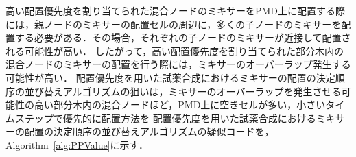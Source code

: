 高い配置優先度を割り当てられた混合ノードのミキサーをPMD上に配置する際には，親ノードのミキサーの配置セルの周辺に，多くの子ノードのミキサーを配置する必要がある．その場合，それぞれの子ノードのミキサーが近接して配置される可能性が高い．
したがって，高い配置優先度を割り当てられた部分木内の混合ノードのミキサーの配置を行う際には，ミキサーのオーバーラップ発生する可能性が高い．
配置優先度を用いた試薬合成におけるミキサーの配置の決定順序の並び替えアルゴリズムの狙いは，ミキサーのオーバーラップを発生させる可能性の高い部分木内の混合ノードほど，PMD上に空きセルが多い，小さいタイムステップで優先的に配置方法を
配置優先度を用いた試薬合成におけるミキサーの配置の決定順序の並び替えアルゴリズムの疑似コードを，Algorithm~\ref{alg:PPValue}に示す．
